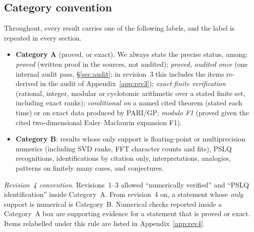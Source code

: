\documentclass[11pt]{article}
\theoremstyle{definition}
\theoremstyle{plain}
\begin{document}
\subsection{Category convention}\label{sec:cat}
Throughout, every result carries one of the following labels, and the label is repeated in every section.
\begin{itemize}[leftmargin=2em]
\item \textbf{Category A} (proved, or exact). We always state the precise status, among:
\emph{proved} (written proof in the sources, not audited); \emph{proved, audited once} (one internal audit
pass, \S\ref{sec:audit}; in revision~3 this includes the items re-derived in the audit of Appendix~\ref{app:rev3}); \emph{exact finite verification}
(rational, integer, modular or cyclotomic arithmetic over a stated finite set, including exact ranks); \emph{conditional on} a named cited theorem
(stated each time) or on exact data produced by PARI/GP; \emph{modulo F1} (proved given the cited two-dimensional Euler--Maclaurin expansion F1).
\item \textbf{Category B}: results whose only support is floating-point or multiprecision numerics (including SVD ranks, FFT character counts and
fits), PSLQ recognitions, identifications by citation only, interpretations, analogies, patterns on finitely many cases, and conjectures.
\end{itemize}
\emph{Revision~4 convention.} Revisions~1--3 allowed ``numerically verified'' and ``PSLQ identification'' inside Category~A. From revision~4 on, a
statement whose \emph{only} support is numerical is Category~B. Numerical checks reported inside a Category~A box are supporting evidence for a
statement that is proved or exact. Items relabelled under this rule are listed in Appendix~\ref{app:rev4}.
\end{document}
